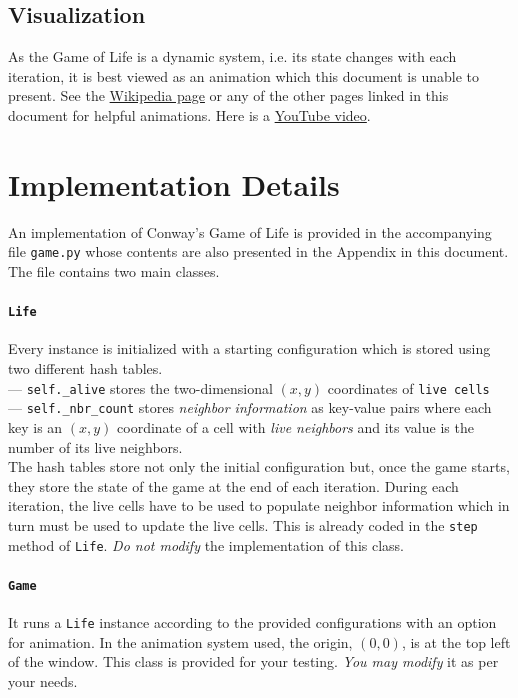 \documentclass[addpoints]{exam}
\begin{document}
\subsection{Visualization}

As the Game of Life is a dynamic system, i.e. its state changes with each iteration, it is best viewed as an animation which this document is unable to present. See the \href{https://en.wikipedia.org/wiki/Conway's_Game_of_Life}{Wikipedia page} or any of the other pages linked in this document for helpful animations. Here is a \href{https://www.youtube.com/watch?v=C2vgICfQawE}{YouTube video}.

\section{Implementation Details}

An implementation of Conway's Game of Life is provided in the accompanying file \texttt{game.py} whose contents are also presented in the Appendix in this document. The file contains two main classes.

\paragraph{\texttt{Life}} Every instance is initialized with a starting configuration which is stored using two different hash tables.\\
--- \texttt{self.\_alive} stores the two-dimensional $(x,y)$ coordinates of \texttt{live cells}\\\smallskip
--- \texttt{self.\_nbr\_count} stores \textit{neighbor information} as key-value pairs where each key is an $(x,y)$ coordinate of a cell with \textit{live neighbors} and its value is the number of its live neighbors.\\
The hash tables store not only the initial configuration but, once the game starts, they store the state of the game at the end of each iteration. During each iteration, the live cells have to be used to populate neighbor information which in turn must be used to update the live cells. This is already coded in the \texttt{step} method of \texttt{Life}. \textit{Do not modify} the implementation of this class.

\paragraph{\texttt{Game}} It runs a \texttt{Life} instance according to the provided configurations with an option for animation. In the animation system used, the origin, $(0,0)$, is at the top left of the window. This class is provided for your testing. \textit{You may modify} it as per your needs.
\end{document}
